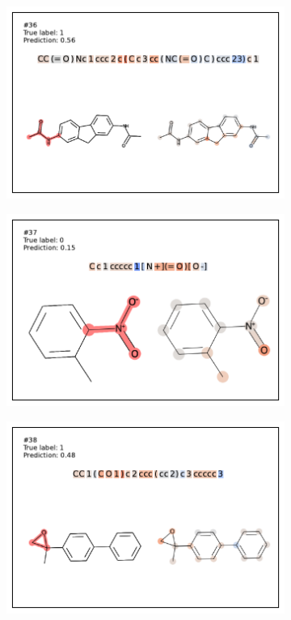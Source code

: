 \begin{figure}
\begin{subfigure}[b]{0.33\textwidth}
\end{subfigure}\begin{subfigure}[b]{0.33\textwidth} 
  \centering 
  \includegraphics[width=\textwidth]{figures/ames/ames36.pdf} 
\end{subfigure} 
\begin{subfigure}[b]{0.33\textwidth} 
  \centering 
  \includegraphics[width=\textwidth]{figures/ames/ames37.pdf} 
\end{subfigure}\begin{subfigure}[b]{0.33\textwidth} 
  \centering 
  \includegraphics[width=\textwidth]{figures/ames/ames38.pdf} 

\end{subfigure}
\end{figure}
